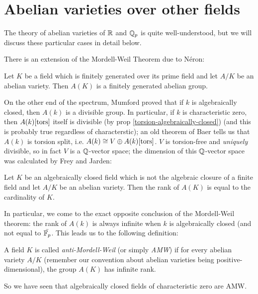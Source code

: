 \section{Abelian varieties over other fields}

The theory of abelian varieties of $\mathbb{R}$ and $\mathbb{Q}_p$ is quite well-understood, but we will discuss these particular cases in detail below. 

There is an extension of the Mordell-Weil Theorem due to N\'eron:

\begin{theorem}
\label{neron-mordell-weil}
Let $K$ be a field which is finitely generated over its prime field and let $A/K$ be an abelian variety. Then $A(K)$ is a finitely generated abelian group.
\end{theorem}

On the other end of the spectrum, Mumford proved that if $k$ is algebraically closed, then $A(k)$ is a divisible group. In particular, if $k$ is characteristic zero, then $A(k)[\operatorname{tors}]$ itself is divisible (by prop \ref{torsion-algebraically-closed}) (and this is probably true regardless of characterstic); an old theorem of Baer tells us that $A(k)$ is torsion split, i.e. $A(k)\cong V\oplus A(k)[\operatorname{tors}]$. $V$ is torsion-free and \emph{uniquely} divisible, so in fact $V$ is a $\mathbb{Q}$-vector space; the dimension of this $\mathbb{Q}$-vector space was calculated by Frey and Jarden:

\begin{theorem}
\label{frey-jarden}
Let $K$ be an algebraically closed field which is not the algebraic closure of a finite field and let $A/K$ be an abelian variety. Then the rank of $A(K)$ is equal to the cardinality of $K$.
\end{theorem}

In particular, we come to the exact opposite conclusion of the Mordell-Weil theorem: the rank of $A(k)$ is always infinite when $k$ is algebraically closed (and not equal to $\bar{\mathbb{F}_p}$. This leads us to the following definition:

\begin{definition}
A field $K$ is called \emph{anti-Mordell-Weil} (or simply \emph{AMW}) if for every abelian variety $A/K$ (remember our convention about abelian varieties being positive-dimensional), the group $A(K)$ has infinite rank.
\end{definition}

So we have seen that algebraically closed fields of characteristic zero are AMW. 

